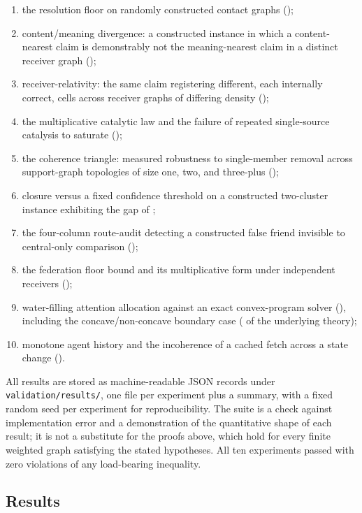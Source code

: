 \documentclass[11pt,twocolumn,a4paper]{article}
\theoremstyle{frathm}
\theoremstyle{definition}
\theoremstyle{remark}
\begin{document}
\begin{enumerate}[leftmargin=1.4em,itemsep=2pt]
\item the resolution floor on randomly constructed contact graphs
();
\item content/meaning divergence: a constructed instance in which a
content-nearest claim is demonstrably not the meaning-nearest claim in a
distinct receiver graph ();
\item receiver-relativity: the same claim registering different, each
internally correct, cells across receiver graphs of differing density
();
\item the multiplicative catalytic law and the failure of repeated
single-source catalysis to saturate ();
\item the coherence triangle: measured robustness to single-member
removal across support-graph topologies of size one, two, and three-plus
();
\item closure versus a fixed confidence threshold on a constructed
two-cluster instance exhibiting the gap of ;
\item the four-column route-audit detecting a constructed false friend
invisible to central-only comparison ();
\item the federation floor bound and its multiplicative form under
independent receivers ();
\item water-filling attention allocation against an exact convex-program
solver (), including the concave/non-concave
boundary case ( of the underlying theory);
\item monotone agent history and the incoherence of a cached fetch across
a state change ().
\end{enumerate}

All results are stored as machine-readable JSON records under
\texttt{validation/results/}, one file per experiment plus a summary,
with a fixed random seed per experiment for reproducibility. The suite is
a check against implementation error and a demonstration of the
quantitative shape of each result; it is not a substitute for the proofs
above, which hold for every finite weighted graph satisfying the stated
hypotheses. All ten experiments passed with zero violations of any
load-bearing inequality.

\subsection{Results}
\label{sec:validation-results}
\end{document}
